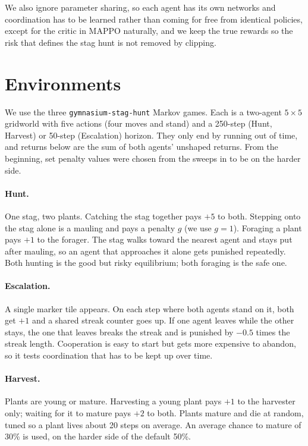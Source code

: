 \documentclass{article}
\begin{document}
We also ignore parameter sharing, so each agent has its own networks and coordination has to be
learned rather than coming for free from identical policies, except for the critic in MAPPO naturally, and we keep the true rewards so
the risk that defines the stag hunt is not removed by clipping.

\section{Environments}
\label{sec:envs}

We use the three \texttt{gymnasium-stag-hunt} Markov games. Each is a two-agent $5\times5$
gridworld with five actions (four moves and stand) and a 250-step (Hunt, Harvest) or 50-step
(Escalation) horizon. They only end by running out of time, and returns below are the
sum of both agents' unshaped returns.
From the beginning, set penalty values were chosen from the sweeps in \citet{prosoc} to be on the harder side.

\paragraph{Hunt.} One stag, two plants. Catching the stag together pays $+5$ to both.
Stepping onto the stag alone is a mauling and pays a penalty $g$ (we use $g=1$). Foraging a
plant pays $+1$ to the forager. The stag walks toward the nearest agent and stays put after
mauling, so an agent that approaches it alone gets punished repeatedly. Both hunting is the
good but risky equilibrium; both foraging is the safe one.

\paragraph{Escalation.} A single marker tile appears. On each step where both agents stand on
it, both get $+1$ and a shared streak counter goes up. If one agent leaves while the other
stays, the one that leaves breaks the streak and is punished by $-0.5$ times the streak
length. Cooperation is easy to start but gets more expensive to abandon, so it tests
coordination that has to be kept up over time.

\paragraph{Harvest.} Plants are young or mature. Harvesting a young plant pays $+1$ to the
harvester only; waiting for it to mature pays $+2$ to both. Plants mature and die at random,
tuned so a plant lives about 20 steps on average. An average chance to mature of 30\% is used, on the harder side of the default 50\%.
\end{document}

